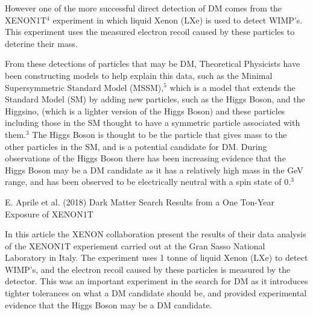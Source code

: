 \documentclass[]{article}
\begin{document}
\par
However one of the more successful direct detection of DM comes from the 
XENON1T$^4$ experiment in which liquid Xenon (LXe) is used to detect WIMP's.
This experiment uses the measured electron recoil caused by these particles
to deterine their mass. 
\par
From these detections of particles that may be DM, Theoretical Physicists have
been constructing models to help explain this data, such as the Minimal Supersymmetric
Standard Model (MSSM),$^5$ which is a model that extends the Standard Model (SM) by
adding new particles, such as the Higgs Boson, and the Higgsino, (which is a
lighter version of the Higgs Boson) and these particles including those in the SM 
thought to have a symmetric particle associated with them.$^3$ The Higgs Boson is thought to be the particle
that gives mass to the other particles in the SM, and is a potential 
candidate for DM. During observations of the Higgs Boson there has been increasing
evidence that the Higgs Boson may be a DM candidate
as it has a relatively high mass in the GeV range, and has been observed
to be electrically neutral with a spin state of 0.$^3$
\par
\newpage
\noindent 
 [4] E. Aprile et al. (2018) Dark Matter Search Results from a One Ton-Year Exposure of XENON1T
\par
In this article the XENON collaboration present the results of their data analysis
of the XENON1T experiement carried out at the Gran Sasso National Laboratory in Italy.
The experiment uses  1 tonne of liquid Xenon (LXe) to detect WIMP's, and the 
electron recoil caused by these particles is measured by the detector. This was an 
important experiment in the search for DM as it introduces tighter tolerances on what 
a DM candidate should be, and provided experimental evidence that the Higgs Boson
may be a DM candidate.\parskip 0.2cm
\end{document}
